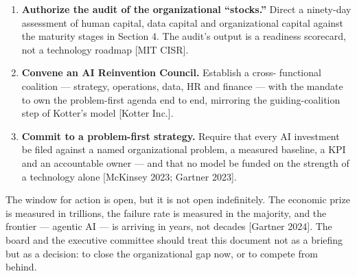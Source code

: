 \begin{enumerate}
  \item \textbf{Authorize the audit of the organizational ``stocks.''} Direct
        a ninety-day assessment of human capital, data capital and
        organizational capital against the maturity stages in Section 4. The
        audit's output is a readiness scorecard, not a technology roadmap
        [MIT CISR].
  \item \textbf{Convene an AI Reinvention Council.} Establish a cross-
        functional coalition — strategy, operations, data, HR and finance —
        with the mandate to own the problem-first agenda end to end, mirroring
        the guiding-coalition step of Kotter's model [Kotter Inc.].
  \item \textbf{Commit to a problem-first strategy.} Require that every AI
        investment be filed against a named organizational problem, a measured
        baseline, a KPI and an accountable owner — and that no model be funded
        on the strength of a technology alone [McKinsey 2023; Gartner 2023].
\end{enumerate}

\vspace{1em}
\begin{center}
\end{center}

\vspace{0.5em}
\noindent The window for action is open, but it is not open indefinitely. The
economic prize is measured in trillions, the failure rate is measured in the
majority, and the frontier — agentic AI — is arriving in years, not decades
[Gartner 2024]. The board and the executive committee should treat this
document not as a briefing but as a decision: to close the organizational gap
now, or to compete from behind.
